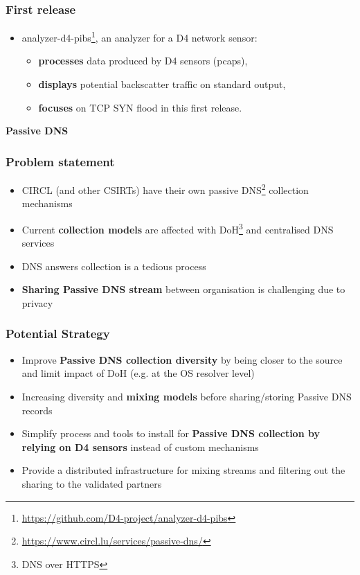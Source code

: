 \documentclass{beamer}
\begin{document}
\begin{frame}
        \frametitle{First release}

 \begin{itemize}
         \item[\checkmark]
           analyzer-d4-pibs\footnote{\url{https://github.com/D4-project/analyzer-d4-pibs}}, an analyzer for a D4 network sensor:

           \begin{itemize}
           \item {\bf processes} data produced by D4 sensors (pcaps),
           \item {\bf displays} potential backscatter traffic on standard output,
           \item {\bf focuses} on TCP SYN flood in this first release.

\end{itemize}
\end{itemize}
\end{frame}



      

\begin{frame}
  \begin{center}
    {\bf Passive DNS}
  \end{center}
\end{frame}

\begin{frame}
        \frametitle{Problem statement}
        \begin{itemize}
                \item CIRCL (and other CSIRTs) have their own passive DNS\footnote{\url{https://www.circl.lu/services/passive-dns/}} collection mechanisms
                \item Current {\bf collection models} are affected with DoH\footnote{DNS over HTTPS} and centralised DNS services
                \item DNS answers collection is a tedious process
                \item {\bf Sharing Passive DNS stream} between organisation is challenging due to privacy
        \end{itemize}
\end{frame}

\begin{frame}
        \frametitle{Potential Strategy}
 \begin{itemize}
         \item Improve {\bf Passive DNS collection diversity} by being closer to the source and limit impact of DoH (e.g. at the OS resolver level)
         \item Increasing diversity and {\bf mixing models} before sharing/storing Passive DNS records
         \item Simplify process and tools to install for {\bf Passive DNS collection by relying on D4 sensors} instead of custom mechanisms
         \item Provide a distributed infrastructure for mixing streams and filtering out the sharing to the validated partners
 \end{itemize}
\end{frame}
\end{document}

